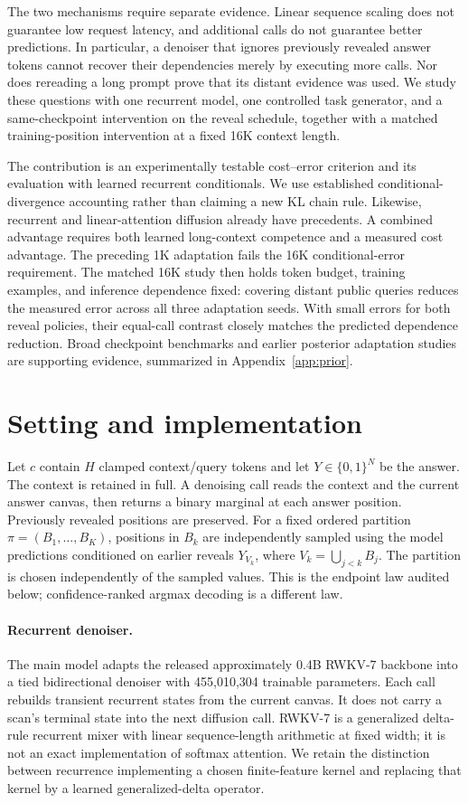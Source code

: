 \documentclass{article}
\begin{document}
The two mechanisms require separate evidence. Linear sequence scaling does not
guarantee low request latency, and additional calls do not guarantee better
predictions. In particular, a denoiser that ignores previously revealed answer
tokens cannot recover their dependencies merely by executing more calls. Nor
does rereading a long prompt prove that its distant evidence was used. We study
these questions with one recurrent model, one controlled task generator, and a
same-checkpoint intervention on the reveal schedule, together with a matched
training-position intervention at a fixed 16K context length.

The contribution is an experimentally testable cost--error criterion
and its evaluation with learned recurrent conditionals. We use established
conditional-divergence accounting rather than claiming a new KL chain rule.
Likewise, recurrent and linear-attention diffusion already have precedents.
A combined advantage requires both learned long-context competence and a
measured cost advantage. The preceding 1K adaptation fails the 16K
conditional-error requirement. The matched 16K study then holds token budget,
training examples, and inference dependence fixed: covering distant public
queries reduces the measured error across all three adaptation seeds. With
small errors for both reveal policies, their equal-call contrast closely
matches the predicted dependence reduction. Broad checkpoint benchmarks and earlier posterior adaptation
studies are supporting evidence, summarized in Appendix~\ref{app:prior}.

\section{Setting and implementation}
Let $c$ contain $H$ clamped context/query tokens and let $Y\in\{0,1\}^N$ be the
answer. The context is retained in full. A denoising call reads the context and
the current answer canvas, then returns a binary marginal at each answer
position. Previously revealed positions are preserved. For a fixed ordered
partition $\pi=(B_1,\ldots,B_K)$, positions in $B_k$ are independently sampled
using the model predictions conditioned on earlier reveals
$Y_{V_k}$, where $V_k=\bigcup_{j<k}B_j$. The partition is chosen independently
of the sampled values. This is the endpoint law audited below; confidence-ranked
argmax decoding is a different law.

\paragraph{Recurrent denoiser.}
The main model adapts the released approximately 0.4B RWKV-7 backbone
\citep{rwkv7} into a tied bidirectional denoiser with 455,010,304 trainable
parameters. Each call rebuilds transient recurrent states from the current
canvas. It does not carry a scan's terminal state into the next diffusion call.
RWKV-7 is a generalized delta-rule recurrent mixer with linear sequence-length
arithmetic at fixed width; it is not an exact implementation of softmax
attention. We retain the distinction between recurrence implementing a chosen
finite-feature kernel \citep{lineartransformer} and replacing that kernel by a
learned generalized-delta operator.
\end{document}

